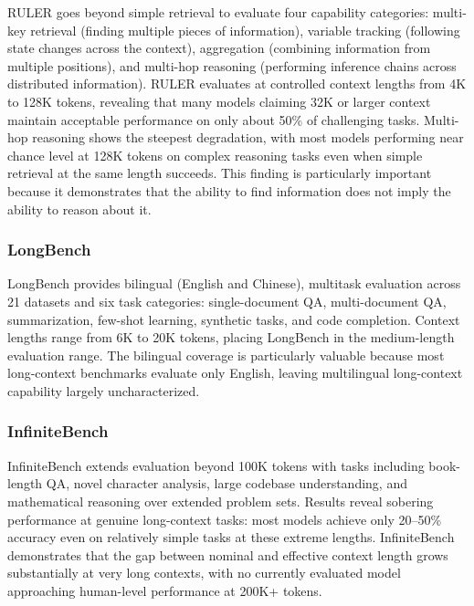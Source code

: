 \documentclass[11pt,letterpaper]{article}
\begin{document}
RULER \cite{hsieh2024ruler} goes beyond simple retrieval to evaluate four capability categories: multi-key retrieval (finding multiple pieces of information), variable tracking (following state changes across the context), aggregation (combining information from multiple positions), and multi-hop reasoning (performing inference chains across distributed information). RULER evaluates at controlled context lengths from 4K to 128K tokens, revealing that many models claiming 32K or larger context maintain acceptable performance on only about 50\% of challenging tasks. Multi-hop reasoning shows the steepest degradation, with most models performing near chance level at 128K tokens on complex reasoning tasks even when simple retrieval at the same length succeeds. This finding is particularly important because it demonstrates that the ability to find information does not imply the ability to reason about it.

\subsubsection{LongBench}

LongBench \cite{bai2024longbench} provides bilingual (English and Chinese), multitask evaluation across 21 datasets and six task categories: single-document QA, multi-document QA, summarization, few-shot learning, synthetic tasks, and code completion. Context lengths range from 6K to 20K tokens, placing LongBench in the medium-length evaluation range. The bilingual coverage is particularly valuable because most long-context benchmarks evaluate only English, leaving multilingual long-context capability largely uncharacterized.

\subsubsection{InfiniteBench}

InfiniteBench \cite{zhang2024infinitebench} extends evaluation beyond 100K tokens with tasks including book-length QA, novel character analysis, large codebase understanding, and mathematical reasoning over extended problem sets. Results reveal sobering performance at genuine long-context tasks: most models achieve only 20--50\% accuracy even on relatively simple tasks at these extreme lengths. InfiniteBench demonstrates that the gap between nominal and effective context length grows substantially at very long contexts, with no currently evaluated model approaching human-level performance at 200K+ tokens.
\end{document}
